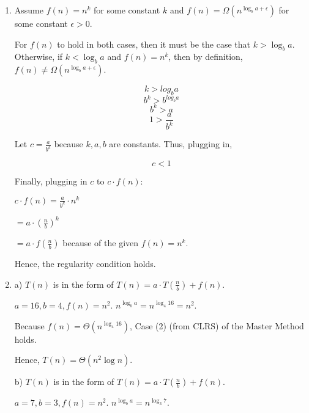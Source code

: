 \documentclass[a4paper]{report}
\begin{document}
\begin{enumerate}
    \par
    \bigskip

    \item
        Assume $f(n) = n^k$ for some constant $k$ and $f(n) = \Omega(n^{\log_b a + \epsilon})$ for some constant $\epsilon > 0$.

        For $f(n)$ to hold in both cases, then it must be the case that $k > \log _{b} a$. Otherwise, if $k < \log _{b} a$ and
        $f(n) = n^k$, then by definition, $f(n) \neq \Omega(n^{\log_b a + \epsilon})$.

        $$ k > log_b a$$
        $$ b^k > b^{log_b a} $$
        $$ b^k > a $$
        $$ 1 > \frac{a}{b^k} $$

        Let $c = \frac{a}{b^k}$ because $k, a, b$ are constants.  Thus, plugging in,

        $$ c < 1 $$

        Finally, plugging in $c$ to $c \cdot f(n)$:

        $c \cdot f(n) = \frac{a}{b^k} \cdot n^k$

        $             = a \cdot (\frac{n}{b})^k$

        $             = a \cdot f(\frac{n}{b})$
        because of the given $f(n) = n^k$.

        Hence, the regularity condition holds. 

    \pagebreak
    \par
    \bigskip

    \item

      a) 
      $T(n)$ is in the form of $T(n) = a \cdot T(\frac{n}{b}) + f(n)$.

      $a = 16, b = 4, f(n) = n^2$. $n^{\log_b a} = n^{\log_4 16} = n^2$. 

      Because $f(n) = \Theta(n^{\log_4 16})$, Case (2) (from CLRS) of the Master Method holds. 

      Hence, $T(n) = \Theta(n^2 \log n)$. 


      \bigskip

      b) 
      $T(n)$ is in the form of $T(n) = a \cdot T(\frac{n}{b}) + f(n)$.

      $a = 7, b = 3, f(n) = n^2$. $n^{\log_b a} = n^{\log_3 7}$. 


\end{enumerate}
\end{document}
